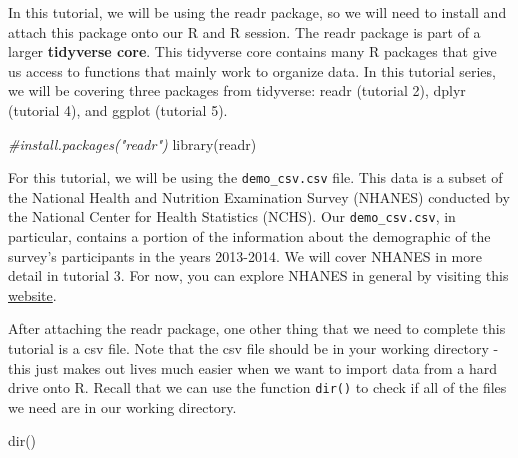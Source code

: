 \documentclass[
]{book}
\newenvironment{Shaded}{\begin{snugshade}}{\end{snugshade}}
\newcommand{\CommentTok}[1]{\textcolor[rgb]{0.56,0.35,0.01}{\textit{#1}}}
\newcommand{\FunctionTok}[1]{\textcolor[rgb]{0.00,0.00,0.00}{#1}}
\newcommand{\NormalTok}[1]{#1}
\begin{document}
In this tutorial, we will be using the readr package, so we will need to install and attach this package onto our R and R session. The readr package is part of a larger \textbf{tidyverse core}. This tidyverse core contains many R packages that give us access to functions that mainly work to organize data. In this tutorial series, we will be covering three packages from tidyverse: readr (tutorial 2), dplyr (tutorial 4), and ggplot (tutorial 5).

\begin{Shaded}
\begin{Highlighting}[]
\CommentTok{\#install.packages("readr")}
\FunctionTok{library}\NormalTok{(readr)}
\end{Highlighting}
\end{Shaded}

For this tutorial, we will be using the \texttt{demo\_csv.csv} file. This data is a subset of the National Health and Nutrition Examination Survey (NHANES) conducted by the National Center for Health Statistics (NCHS). Our \texttt{demo\_csv.csv}, in particular, contains a portion of the information about the demographic of the survey's participants in the years 2013-2014. We will cover NHANES in more detail in tutorial 3. For now, you can explore NHANES in general by visiting this \href{https://wwwn.cdc.gov/nchs/nhanes/Default.aspx}{website}.

After attaching the readr package, one other thing that we need to complete this tutorial is a csv file. Note that the csv file should be in your working directory - this just makes out lives much easier when we want to import data from a hard drive onto R. Recall that we can use the function \texttt{dir()} to check if all of the files we need are in our working directory.

\begin{Shaded}
\begin{Highlighting}[]
\FunctionTok{dir}\NormalTok{()}
\end{Highlighting}
\end{Shaded}
\end{document}
